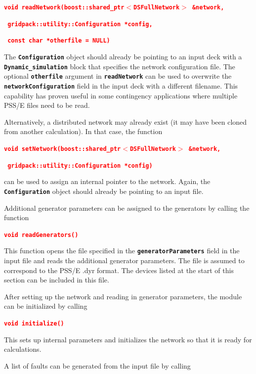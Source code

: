 \documentclass[12pt]{report} %
\begin{document}
\textcolor{red}{\texttt{\textbf{void readNetwork(boost::shared\_ptr$\boldsymbol{\mathrm{<}}$DSFullNetwork$\boldsymbol{\mathrm{>}}$ \&network,}}}

\textcolor{red}{\texttt{\textbf{  gridpack::utility::Configuration *config,}}}

\textcolor{red}{\texttt{\textbf{  const char *otherfile = NULL)}}}

The \texttt{\textbf{Configuration}} object should already be pointing to an input deck with a \texttt{\textbf{Dynamic\_simulation}} block that specifies the network configuration file. The optional \texttt{\textbf{otherfile}} argument in \texttt{\textbf{readNetwork}} can be used to overwrite the \texttt{\textbf{networkConfiguration}} field in the input deck with a different filename. This capability has proven useful in some contingency applications where multiple PSS/E files need to be read.

Alternatively, a distributed network may already exist (it may have been cloned from another calculation). In that case, the function

\textcolor{red}{\texttt{\textbf{void setNetwork(boost::shared\_ptr$\boldsymbol{\mathrm{<}}$DSFullNetwork$\boldsymbol{\mathrm{>}}$ \&network,}}}

\textcolor{red}{\texttt{\textbf{  gridpack::utility::Configuration *config)}}}

can be used to assign an internal pointer to the network. Again, the \texttt{\textbf{Configuration}} object should already be pointing to an input file.

Additional generator parameters can be assigned to the generators by calling the function

\textcolor{red}{\texttt{\textbf{void readGenerators()}}}

This function opens the file specified in the \texttt{\textbf{generatorParameters}} field in the input file and reads the additional generator parameters. The file is assumed to correspond to the PSS/E .dyr format. The devices listed at the start of this section can be included in this file.

After setting up the network and reading in generator parameters, the module can be initialized by calling

\textcolor{red}{\texttt{\textbf{void initialize()}}}

This sets up internal parameters and initializes the network so that it is ready for calculations.

A list of faults can be generated from the input file by calling
\end{document}
